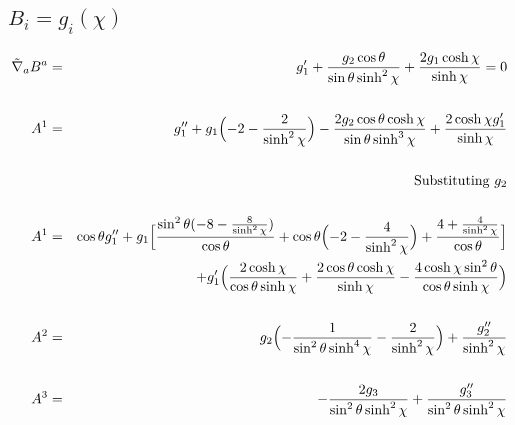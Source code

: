 \documentclass[10pt,letterpaper]{article}
\numberwithin{equation}{section}
\begin{document}
\subsection{$B_i = g_i(\chi)$}
\begin{eqnarray}
\tilde\nabla_a B^a&=& g'_{1} + \frac{g_{2} \cos\theta}{\sin\theta \sinh^2\chi} + \frac{2 g_{1} \cosh\chi}{\sinh\chi}=0
\\ \nonumber\\
A^1&=& g''_{1} + g_{1} \Bigl(-2 -  \frac{2}{\sinh^2\chi}\Bigr) -  \frac{2 g_{2} \cos\theta \cosh\chi}{\sin\theta \sinh^3\chi} + \frac{2 \cosh\chi g'_{1}}{\sinh\chi}
\\ \nonumber\\
&&\text{Substituting $g_2$}
\\ \nonumber\\
A^1&=& \cos\theta g''_{1} + g_{1} \Bigl[\frac{\sin^2\theta (-8 -  \frac{8}{\sinh^2\chi})}{\cos\theta} + \cos\theta \Bigl( -2 -  \frac{4}{\sinh^2\chi}\Bigr) + \frac{4 + \frac{4}{\sinh^2\chi}}{\cos\theta}\Bigr] \nonumber \\ 
&& + g'_{1} \Bigl(\frac{2 \cosh\chi}{\cos\theta \sinh\chi} + \frac{2 \cos\theta \cosh\chi}{\sinh\chi} -  \frac{4 \cosh\chi \sin^2\theta}{\cos\theta \sinh\chi}\Bigr)
\\ \nonumber\\
A^2&=& g_{2} \Bigl(- \frac{1}{\sin^2\theta \sinh^4\chi} -  \frac{2}{\sinh^2\chi}\Bigr) + \frac{g''_{2}}{\sinh^2\chi}
\\ \nonumber\\
A^3&=& - \frac{2 g_{3}}{\sin^2\theta \sinh^2\chi} + \frac{g''_{3}}{\sin^2\theta \sinh^2\chi}
\end{eqnarray}
\end{document}
